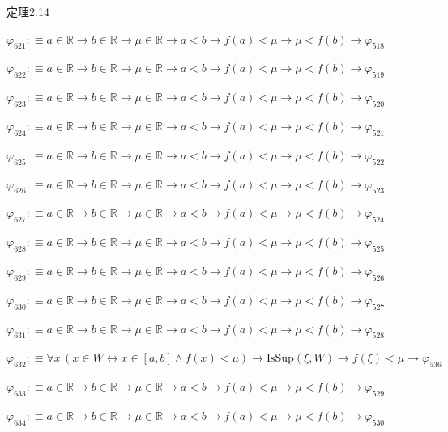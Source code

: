 \begin{fullproof}{定理2.14}
\begin{abbrevlist}
\item $\varphi_{621} :\equiv a \in \mathbb{R} \to b \in \mathbb{R} \to \mu \in \mathbb{R} \to a < b \to f(a) < \mu \to \mu < f(b) \to \varphi_{518}$
\item $\varphi_{622} :\equiv a \in \mathbb{R} \to b \in \mathbb{R} \to \mu \in \mathbb{R} \to a < b \to f(a) < \mu \to \mu < f(b) \to \varphi_{519}$
\item $\varphi_{623} :\equiv a \in \mathbb{R} \to b \in \mathbb{R} \to \mu \in \mathbb{R} \to a < b \to f(a) < \mu \to \mu < f(b) \to \varphi_{520}$
\item $\varphi_{624} :\equiv a \in \mathbb{R} \to b \in \mathbb{R} \to \mu \in \mathbb{R} \to a < b \to f(a) < \mu \to \mu < f(b) \to \varphi_{521}$
\item $\varphi_{625} :\equiv a \in \mathbb{R} \to b \in \mathbb{R} \to \mu \in \mathbb{R} \to a < b \to f(a) < \mu \to \mu < f(b) \to \varphi_{522}$
\item $\varphi_{626} :\equiv a \in \mathbb{R} \to b \in \mathbb{R} \to \mu \in \mathbb{R} \to a < b \to f(a) < \mu \to \mu < f(b) \to \varphi_{523}$
\item $\varphi_{627} :\equiv a \in \mathbb{R} \to b \in \mathbb{R} \to \mu \in \mathbb{R} \to a < b \to f(a) < \mu \to \mu < f(b) \to \varphi_{524}$
\item $\varphi_{628} :\equiv a \in \mathbb{R} \to b \in \mathbb{R} \to \mu \in \mathbb{R} \to a < b \to f(a) < \mu \to \mu < f(b) \to \varphi_{525}$
\item $\varphi_{629} :\equiv a \in \mathbb{R} \to b \in \mathbb{R} \to \mu \in \mathbb{R} \to a < b \to f(a) < \mu \to \mu < f(b) \to \varphi_{526}$
\item $\varphi_{630} :\equiv a \in \mathbb{R} \to b \in \mathbb{R} \to \mu \in \mathbb{R} \to a < b \to f(a) < \mu \to \mu < f(b) \to \varphi_{527}$
\item $\varphi_{631} :\equiv a \in \mathbb{R} \to b \in \mathbb{R} \to \mu \in \mathbb{R} \to a < b \to f(a) < \mu \to \mu < f(b) \to \varphi_{528}$
\item $\varphi_{632} :\equiv \forall x\,(x \in W \leftrightarrow x \in [a,b] \land f(x) < \mu) \to \mathrm{IsSup}(\xi,W) \to f(\xi) < \mu \to \varphi_{536}$
\item $\varphi_{633} :\equiv a \in \mathbb{R} \to b \in \mathbb{R} \to \mu \in \mathbb{R} \to a < b \to f(a) < \mu \to \mu < f(b) \to \varphi_{529}$
\item $\varphi_{634} :\equiv a \in \mathbb{R} \to b \in \mathbb{R} \to \mu \in \mathbb{R} \to a < b \to f(a) < \mu \to \mu < f(b) \to \varphi_{530}$

\end{abbrevlist}
\end{fullproof}
